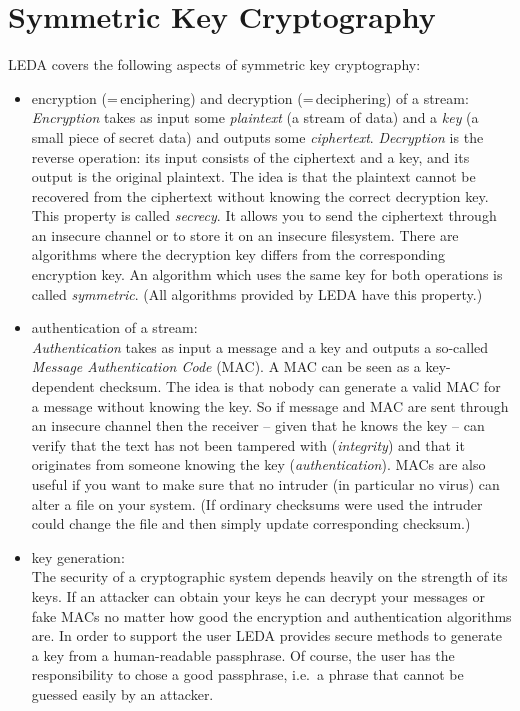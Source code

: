 
\chapter {Symmetric Key Cryptography} \label{Cryptography}

LEDA covers the following aspects of symmetric key cryptography:
\begin{itemize}
\item encryption (=\,enciphering) and decryption (=\,deciphering) of a 
stream:\\
\emph{Encryption} takes as input some \emph{plaintext} (a stream of data) and
a \emph{key} (a small piece of secret data) and outputs some \emph{ciphertext}.
\emph{Decryption} is the reverse operation: its input consists of the
ciphertext and a key, and its output is the original plaintext.
The idea is that the plaintext cannot be recovered from the ciphertext without
knowing the correct decryption key. This property is called \emph{secrecy}.
It allows you to send the ciphertext through an insecure channel or to store  
it on an insecure filesystem. 
There are algorithms where the decryption key differs from the corresponding
encryption key. An algorithm which uses the same key for both operations is
called \emph{symmetric}. (All algorithms provided by LEDA have this property.)
\item authentication of a stream:\\
\emph{Authentication} takes as input a message and a key and outputs a 
so-called \emph{Message Authentication Code} (MAC). A MAC can be seen as a 
key-dependent checksum. The idea is that nobody can generate a valid MAC for a
message without knowing the key. 
So if message and MAC are sent through an insecure channel then the receiver 
-- given that he knows the key -- can verify that the text has not been 
tampered with (\emph{integrity}) and that it originates from someone knowing
the key (\emph{authentication}). MACs are also useful if you want to make sure
that no intruder (in particular no virus) can alter a file on your system. (If
ordinary checksums were used the intruder could change the file and then
simply update corresponding checksum.)
\item key generation:\\
The security of a cryptographic system depends heavily on the strength of its
keys. If an attacker can obtain your keys he can decrypt your messages or fake
MACs no matter how good the encryption and authentication algorithms are.
In order to support the user LEDA provides secure methods to generate a key
from a human-readable passphrase. Of course, the user has the responsibility to
chose a good passphrase, i.e.~a phrase that cannot be guessed easily by an
attacker.
\end{itemize}

